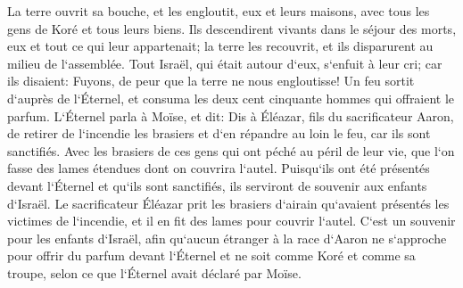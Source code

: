\verse La terre ouvrit sa bouche, et les engloutit, eux et leurs maisons, avec tous les gens de Koré et tous leurs biens. 
\verse Ils descendirent vivants dans le séjour des morts, eux et tout ce qui leur appartenait; la terre les recouvrit, et ils disparurent au milieu de l`assemblée. 
\verse Tout Israël, qui était autour d`eux, s`enfuit à leur cri; car ils disaient: Fuyons, de peur que la terre ne nous engloutisse! 
\verse Un feu sortit d`auprès de l`Éternel, et consuma les deux cent cinquante hommes qui offraient le parfum. 
\verse L`Éternel parla à Moïse, et dit: 
\verse Dis à Éléazar, fils du sacrificateur Aaron, de retirer de l`incendie les brasiers et d`en répandre au loin le feu, car ils sont sanctifiés. 
\verse Avec les brasiers de ces gens qui ont péché au péril de leur vie, que l`on fasse des lames étendues dont on couvrira l`autel. Puisqu`ils ont été présentés devant l`Éternel et qu`ils sont sanctifiés, ils serviront de souvenir aux enfants d`Israël. 
\verse Le sacrificateur Éléazar prit les brasiers d`airain qu`avaient présentés les victimes de l`incendie, et il en fit des lames pour couvrir l`autel. 
\verse C`est un souvenir pour les enfants d`Israël, afin qu`aucun étranger à la race d`Aaron ne s`approche pour offrir du parfum devant l`Éternel et ne soit comme Koré et comme sa troupe, selon ce que l`Éternel avait déclaré par Moïse. 
